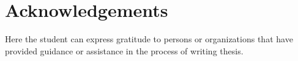 \chapter{\texorpdfstring{Acknowledgements}{}}

Here the student can express gratitude to persons or organizations that have provided guidance or assistance in the process of writing thesis.
